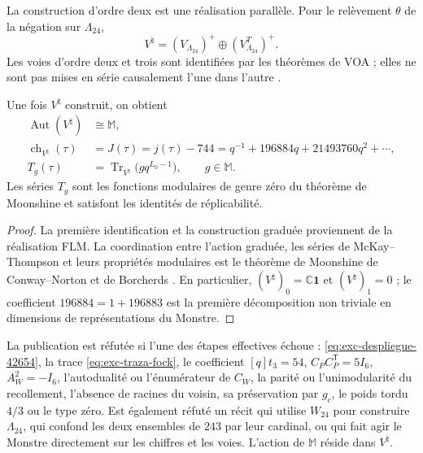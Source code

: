 La construction d'ordre deux est une réalisation parallèle. Pour le relèvement
\(\theta\) de la négation sur \(\Lambda_{24}\),
\begin{equation}
 V^\natural=(V_{\Lambda_{24}})^+
 \oplus(V_{\Lambda_{24}}^T)^+.
 \label{eq:exc-flm}
\end{equation}
Les voies d'ordre deux et trois sont identifiées par les théorèmes de VOA ; elles ne sont pas
mises en série causalement l'une dans l'autre \citep{FLM1988}.

\begin{theorem}
\label{thm:exc-moonshine}
Une fois \(V^\natural\) construit, on obtient
\begin{align}
 \operatorname{Aut}(V^\natural)&\cong\mathbb M,
 \label{eq:exc-aut-monster}\\
 \operatorname{ch}_{V^\natural}(\tau)
 &=J(\tau)=j(\tau)-744
 =q^{-1}+196884q+21493760q^2+\cdots,
 \label{eq:exc-caracter-j}\\
 T_g(\tau)&=\operatorname{Tr}_{V^\natural}
 \bigl(gq^{L_0-1}\bigr),\qquad g\in\mathbb M.
 \label{eq:exc-mckay-thompson}
\end{align}
Les séries \(T_g\) sont les fonctions modulaires de genre zéro du théorème
de Moonshine et satisfont les identités de réplicabilité.
\end{theorem}

\begin{proof}
La première identification et la construction graduée proviennent de la
réalisation FLM. La coordination entre l'action graduée, les séries de
McKay--Thompson et leurs propriétés modulaires est le théorème de Moonshine de
Conway--Norton et de Borcherds
\citep{FLM1988,ConwayNorton1979,Borcherds1992}. En particulier,
\((V^\natural)_0=\mathbb C\mathbf1\) et
\((V^\natural)_1=0\) ; le coefficient \(196884=1+196883\) est la première
décomposition non triviale en dimensions de représentations du Monstre.
\end{proof}

\begin{falsifier}
\label{fals:exc-corredor}
La publication est réfutée si l'une des étapes effectives échoue :
\eqref{eq:exc-despliegue-42654}, la trace
\eqref{eq:exc-traza-fock}, le coefficient \([q]t_3=54\),
\(C_PC_P^{\mathsf T}=5I_6\), \(A_W^2=-I_6\), l'autodualité ou
l'énumérateur de \(C_W\), la parité ou l'unimodularité du recollement, l'absence
de racines du voisin, sa préservation par \(g_c\), le poids tordu
\(4/3\) ou le type zéro. Est également réfuté un récit qui utilise
\(W_{24}\) pour construire \(\Lambda_{24}\), qui confond les deux ensembles
de \(243\) par leur cardinal, ou qui fait agir le Monstre directement
sur les chiffres et les voies. L'action de \(\mathbb M\) réside dans \(V^\natural\).
\end{falsifier}
